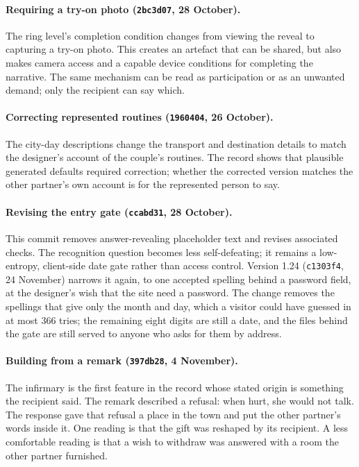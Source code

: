 \documentclass[sigconf,nonacm]{acmart}
\newcommand{\code}[1]{\textnormal{\texttt{\small #1}}}
\begin{document}
\paragraph{Requiring a try-on photo (\code{2bc3d07}, 28 October).}
The ring level's completion condition changes from viewing the reveal to capturing a try-on
photo. This creates an artefact that can be shared, but also makes camera access and a capable
device conditions for completing the narrative. The same mechanism can be read as participation
or as an unwanted demand; only the recipient can say which.

\paragraph{Correcting represented routines (\code{1960404}, 26 October).}
The city-day descriptions change the transport and destination details to match the designer's
account of the couple's routines. The record shows that plausible generated defaults required
correction; whether the corrected version matches the other partner's own account is for the
represented person to say.

\paragraph{Revising the entry gate (\code{ccabd31}, 28 October).}
This commit removes answer-revealing placeholder text and revises associated checks. The
recognition question becomes less self-defeating; it remains a low-entropy, client-side date
gate rather than access control. Version 1.24 (\code{c1303f4}, 24 November) narrows it again, to
one accepted spelling behind a password field, at the designer's wish that the site need a
password. The change removes the spellings that give only the month and day, which a visitor could have
guessed in at most 366 tries; the remaining eight digits are still a date, and the files behind the
gate are still served to anyone who asks for them by address.

\paragraph{Building from a remark (\code{397db28}, 4 November).}
The infirmary is the first feature in the record whose stated origin is something the recipient
said. The remark described a refusal: when hurt, she would not talk. The response gave that
refusal a place in the town and put the other partner's words inside it. One reading is that
the gift was reshaped by its recipient. A less comfortable reading is that a wish to withdraw
was answered with a room the other partner furnished.
\end{document}
